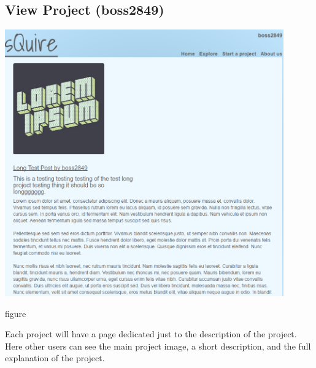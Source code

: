 \documentclass[11pt]{article}
\begin{document}
\subsection{View Project (boss2849)}
\begin{minipage}{1\textwidth}
    \begin{center}
    \includegraphics[width=0.9\textwidth]{protos/proto-viewproject-boss2849}
    \end{center}
    \caption{figure}{Each project will have a page dedicated just to the description of the project. Here other users can see the main project image, a short description, and the full explanation of the project.}
\end{minipage}
\end{document}
